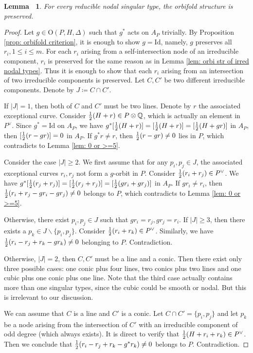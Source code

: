 \documentclass[12pt,reqno,a4paper]{amsart}
\newtheorem{lem}[thm]{Lemma~}
\theoremstyle{remark}
\theoremstyle{definition}
\newcommand{\QQ}{\mathbb{Q}}
\newcommand\Id{\mathrm{Id}}
\newcommand\Or{\mathrm{O}}
\newcommand{\bs}{\backslash}
\begin{document}
\begin{lem}
\label{lem: orbi str of reducible types}
    For every reducible nodal singular type, the orbifold structure is preserved.
\end{lem}
\begin{proof}
    Let $g\in\Or(P,H,\Delta)$ such that $g^*$ acts on $A_P$ trivially.
    By Proposition \ref{prop: orbifold criterion}, it is enough to show $g=\Id$, namely, $g$ preserves all $r_i, 1\le i\le m$. 
    For each $r_i$ arising from a self-intersection node of an irreducible component, $r_i$ is preserved for the same reason as in Lemma \ref{lem: orbi str of irred nodal types}.
    Thus it is enough to show that each $r_i$ arising from an intersection of two irreducible components is preserved.
    Let $C,C'$ be two different irreducible components.
    Denote by $J\coloneqq C\cap C'$.
    
    If $|J|=1$, then both of $C$ and $C'$ must be two lines.
    Denote by $r$ the associated exceptional curve.
    Consider ${1\over2}(H+r)\in P\otimes\QQ$, which is actually an element in $P^\vee$.
    Since $g^*=\Id$ on $A_P$, we have $g^*[{1\over2}(H+r)]=[{1\over2}(H+r)]=[{1\over2}(H+g r)]$ in $A_P$, then $[{1\over2}(r-g r)]=0$ in $A_P$.
    If $g^*r\ne r$, then ${1\over2}(r-g r)\ne 0$ lies in $P$, which contradicts to Lemma \ref{lem: 0 or >=5}.

    Consider the case $|J|\ge 2$.
    We first assume that for any $p_i,p_j\in J$, the associated exceptional curves $r_i, r_j$ not form a $g$-orbit in $P$.
    Consider ${1\over2}(r_i+r_j)\in P^\vee$.
    We have $g^*[{1\over2}(r_j+r_j)]=[{1\over2}(r_j+r_j)]=[{1\over2}(g r_i+g r_j)]$ in $A_P$.
    If $g r_i\ne r_i$, then ${1\over2}(r_i+r_j-g r_i-g r_j)\ne 0$ belongs to $P$, which contradicts to Lemma \ref{lem: 0 or >=5}.

    Otherwise, there exist $p_i,p_j\in J$ such that $g r_i=r_j, g r_j=r_i$.
    If $|J|\ge 3$, then there exists a $p_k\in J\bs\{p_i,p_j\}$.
    Consider ${1\over2}(r_i+r_k)\in P^\vee$.
    Similarly, we have ${1\over2}(r_i-r_j+r_k-g r_k)\ne 0$ belonging to $P$. Contradiction.

    Otherwise, $|J|=2$, then $C,C'$ must be a line and a conic.
    Then there exist only three possible cases: one conic plus four lines, two conics plus two lines and one cubic plus one conic plus one line.
    Note that the third case actually contains more than one singular types, since the cubic could be smooth or nodal. 
    But this is irrelevant to our discussion.

    We can assume that $C$ is a line and $C'$ is a conic.
    Let $C\cap C'=\{p_i,p_j\}$ and let $p_k$ be a node arising from the intersection of $C'$ with an irreducible component of odd degree (which always exists).
    It is direct to verify that ${1\over2}(H+r_i+r_k)\in P^\vee$.
    Then we conclude that ${1\over2}(r_i-r_j+r_k-g^*r_k)\ne 0$ belongs to $P$.
    Contradiction.
\end{proof}
\end{document}
